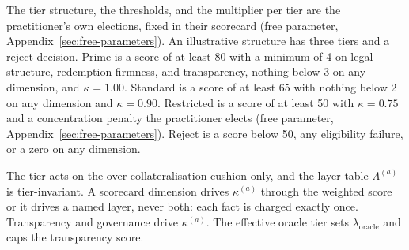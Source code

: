 The tier structure, the thresholds, and the multiplier per tier are the practitioner's own elections, fixed in their scorecard (free parameter, Appendix~\ref{sec:free-parameters}). An illustrative structure has three tiers and a reject decision. Prime is a score of at least 80 with a minimum of 4 on legal structure, redemption firmness, and transparency, nothing below 3 on any dimension, and $\kappa=1.00$. Standard is a score of at least 65 with nothing below 2 on any dimension and $\kappa=0.90$. Restricted is a score of at least 50 with $\kappa=0.75$ and a concentration penalty the practitioner elects (free parameter, Appendix~\ref{sec:free-parameters}). Reject is a score below 50, any eligibility failure, or a zero on any dimension.

The tier acts on the over-collateralisation cushion only, and the layer table $\Lambda^{(a)}$ is tier-invariant. A scorecard dimension drives $\kappa^{(a)}$ through the weighted score or it drives a named layer, never both: each fact is charged exactly once. Transparency and governance drive $\kappa^{(a)}$. The effective oracle tier sets $\lambda_{\mathrm{oracle}}$ and caps the transparency score.

